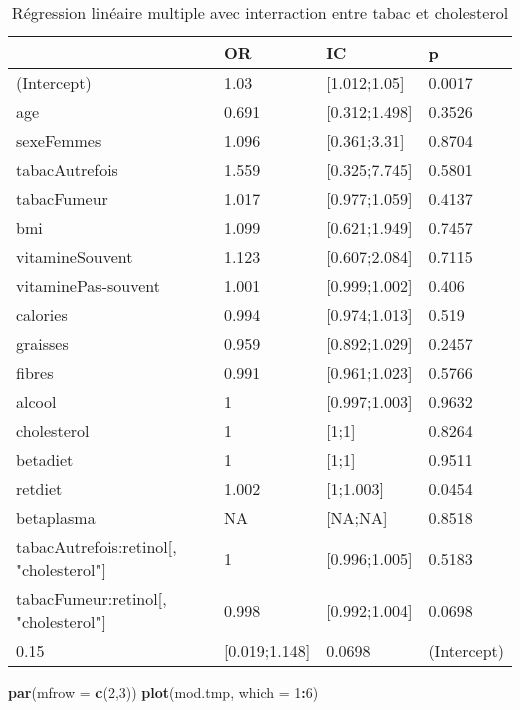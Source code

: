 \documentclass[]{article}
\newenvironment{Shaded}{\begin{snugshade}}{\end{snugshade}}
\newcommand{\KeywordTok}[1]{\textcolor[rgb]{0.13,0.29,0.53}{\textbf{#1}}}
\newcommand{\DataTypeTok}[1]{\textcolor[rgb]{0.13,0.29,0.53}{#1}}
\newcommand{\DecValTok}[1]{\textcolor[rgb]{0.00,0.00,0.81}{#1}}
\newcommand{\OperatorTok}[1]{\textcolor[rgb]{0.81,0.36,0.00}{\textbf{#1}}}
\newcommand{\NormalTok}[1]{#1}
\begin{document}
\begin{table}

\caption{\label{tab:unnamed-chunk-85}Régression linéaire multiple avec interraction entre tabac et cholesterol}
\centering
\begin{tabular}[t]{l|l|l|l}
\hline
  & OR & IC & p\\
\hline
\rowcolor[HTML]{BBD2E1}  (Intercept) & 1.03 & [1.012;1.05] & 0.0017\\
\hline
age & 0.691 & [0.312;1.498] & 0.3526\\
\hline
\rowcolor[HTML]{BBD2E1}  sexeFemmes & 1.096 & [0.361;3.31] & 0.8704\\
\hline
tabacAutrefois & 1.559 & [0.325;7.745] & 0.5801\\
\hline
\rowcolor[HTML]{BBD2E1}  tabacFumeur & 1.017 & [0.977;1.059] & 0.4137\\
\hline
bmi & 1.099 & [0.621;1.949] & 0.7457\\
\hline
\rowcolor[HTML]{BBD2E1}  vitamineSouvent & 1.123 & [0.607;2.084] & 0.7115\\
\hline
vitaminePas-souvent & 1.001 & [0.999;1.002] & 0.406\\
\hline
\rowcolor[HTML]{BBD2E1}  calories & 0.994 & [0.974;1.013] & 0.519\\
\hline
graisses & 0.959 & [0.892;1.029] & 0.2457\\
\hline
\rowcolor[HTML]{BBD2E1}  fibres & 0.991 & [0.961;1.023] & 0.5766\\
\hline
alcool & 1 & [0.997;1.003] & 0.9632\\
\hline
\rowcolor[HTML]{BBD2E1}  cholesterol & 1 & [1;1] & 0.8264\\
\hline
betadiet & 1 & [1;1] & 0.9511\\
\hline
\rowcolor[HTML]{BBD2E1}  retdiet & 1.002 & [1;1.003] & 0.0454\\
\hline
betaplasma & NA & [NA;NA] & 0.8518\\
\hline
\rowcolor[HTML]{BBD2E1}  tabacAutrefois:retinol[, "cholesterol"] & 1 & [0.996;1.005] & 0.5183\\
\hline
tabacFumeur:retinol[, "cholesterol"] & 0.998 & [0.992;1.004] & 0.0698\\
\hline
\rowcolor[HTML]{BBD2E1}  0.15 & [0.019;1.148] & 0.0698 & (Intercept)\\
\hline
\end{tabular}
\end{table}

\begin{Shaded}
\begin{Highlighting}[]
\KeywordTok{par}\NormalTok{(}\DataTypeTok{mfrow =} \KeywordTok{c}\NormalTok{(}\DecValTok{2}\NormalTok{,}\DecValTok{3}\NormalTok{))}
\KeywordTok{plot}\NormalTok{(mod.tmp, }\DataTypeTok{which =} \DecValTok{1}\OperatorTok{:}\DecValTok{6}\NormalTok{)}
\end{Highlighting}
\end{Shaded}
\end{document}
